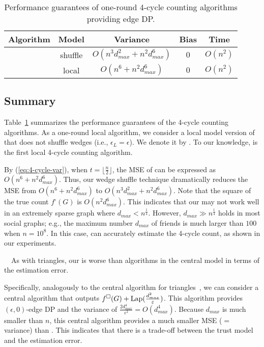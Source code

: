 \begin{table}[t]
  \caption{Performance guarantees of one-round 4-cycle counting algorithms providing edge DP.
  }
  \vspace{-4mm}
  \centering
  \begin{tabular}{|l|c|c|c|c|}
    \hline
    Algorithm & Model & Variance & Bias & Time \\ \hline
    \AlgWSCyc{} & shuffle & $O(n^3 d_{max}^2 + n^2 d_{max}^6)$ & $0$ & $O(n^2)$ \\ \hline
    \AlgWLCyc{} & local & $O(n^6 + n^2 d_{max}^6)$ & $0$ & $O(n^2)$ \\ \hline
  \end{tabular}
  \label{tab:upper_bounds_4cycle}
\end{table}

\subsection{Summary}
\label{sub:summary_4cycle}
Table~\ref{tab:upper_bounds_4cycle} summarizes the performance guarantees of the 4-cycle counting algorithms. 
As a one-round local algorithm, we consider a local model version of \AlgWSCyc{} that does not shuffle wedges (i.e., $\epsilon_L = \epsilon$). 
We denote it by \AlgWLCyc{}. 
To our knowledge, \AlgWLCyc{} is the first local 4-cycle counting algorithm. 

By (\ref{eq:4-cycle-var}), when $t = \lfloor \frac{n}{2} \rfloor$, the MSE of \AlgWLCyc{} can be expressed as $O(n^6 + n^2 d_{max}^6)$. 
Thus, our wedge shuffle technique dramatically reduces the MSE from $O(n^6 + n^2 d_{max}^6)$ to $O(n^3 d_{max}^2 + n^2 d_{max}^6)$. 
Note that the square of the true count $f^\square(G)$ is $O(n^2 d_{max}^6)$. 
This indicates that our \AlgWSCyc{} may not work well in an extremely sparse graph where $d_{max} < n^{\frac{1}{4}}$. 
However, $d_{max} \gg n^{\frac{1}{4}}$ holds in most social graphs; e.g., the maximum number $d_{max}$ of friends is much larger than $100$ when $n=10^8$. 
In this case, \AlgWSCyc{} can accurately estimate the 4-cycle count, as shown in our experiments. 

\smallskip
{}~~As with triangles, our \AlgWSCyc{} is worse than algorithms in the central model in terms of the estimation error. 

Specifically, 
analogously to the central algorithm for triangles~\cite{Imola_USENIX21}, 
we can consider a central algorithm that outputs $f^\square(G) + \textrm{Lap}(\frac{d_{max}^2}{\varepsilon})$. 
This algorithm provides 
$(\epsilon, 0)$-edge DP and the variance of $\frac{2d_{max}^4}{\epsilon^2} = O(d_{max}^4)$. 
Because $d_{max}$ is much smaller than $n$, this central algorithm provides a much smaller MSE ($=$ variance) than \AlgWSCyc{}. 
This indicates 
that there is a trade-off between the trust model and the estimation error. 

